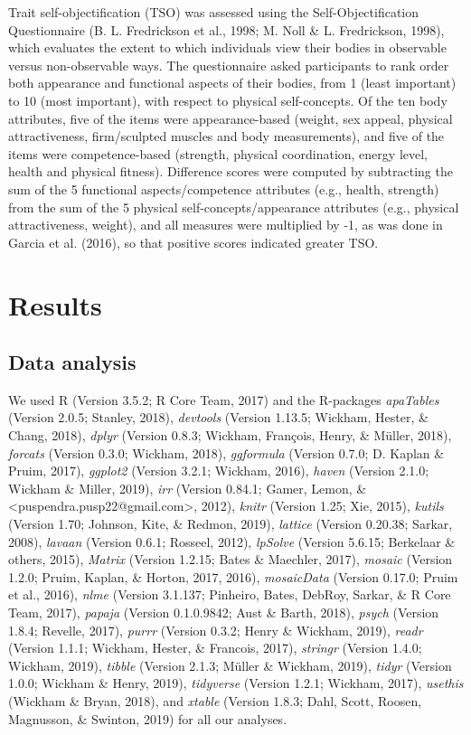 \documentclass[man]{apa6}
\begin{document}
Trait self-objectification (TSO) was assessed using the
Self-Objectification Questionnaire (B. L. Fredrickson et al., 1998; M.
Noll \& L. Fredrickson, 1998), which evaluates the extent to which
individuals view their bodies in observable versus non-observable ways.
The questionnaire asked participants to rank order both appearance and
functional aspects of their bodies, from 1 (least important) to 10 (most
important), with respect to physical self-concepts. Of the ten body
attributes, five of the items were appearance-based (weight, sex appeal,
physical attractiveness, firm/sculpted muscles and body measurements),
and five of the items were competence-based (strength, physical
coordination, energy level, health and physical fitness). Difference
scores were computed by subtracting the sum of the 5 functional
aspects/competence attributes (e.g., health, strength) from the sum of
the 5 physical self-concepts/appearance attributes (e.g., physical
attractiveness, weight), and all measures were multiplied by -1, as was
done in Garcia et al. (2016), so that positive scores indicated greater
TSO.

\section{Results}\label{results}

\subsection{Data analysis}\label{data-analysis}

We used R (Version 3.5.2; R Core Team, 2017) and the R-packages
\emph{apaTables} (Version 2.0.5; Stanley, 2018), \emph{devtools}
(Version 1.13.5; Wickham, Hester, \& Chang, 2018), \emph{dplyr} (Version
0.8.3; Wickham, François, Henry, \& Müller, 2018), \emph{forcats}
(Version 0.3.0; Wickham, 2018), \emph{ggformula} (Version 0.7.0; D.
Kaplan \& Pruim, 2017), \emph{ggplot2} (Version 3.2.1; Wickham, 2016),
\emph{haven} (Version 2.1.0; Wickham \& Miller, 2019), \emph{irr}
(Version 0.84.1; Gamer, Lemon, \&
\textless{}puspendra.pusp22@gmail.com\textgreater{}, 2012), \emph{knitr}
(Version 1.25; Xie, 2015), \emph{kutils} (Version 1.70; Johnson, Kite,
\& Redmon, 2019), \emph{lattice} (Version 0.20.38; Sarkar, 2008),
\emph{lavaan} (Version 0.6.1; Rosseel, 2012), \emph{lpSolve} (Version
5.6.15; Berkelaar \& others, 2015), \emph{Matrix} (Version 1.2.15; Bates
\& Maechler, 2017), \emph{mosaic} (Version 1.2.0; Pruim, Kaplan, \&
Horton, 2017, 2016), \emph{mosaicData} (Version 0.17.0; Pruim et al.,
2016), \emph{nlme} (Version 3.1.137; Pinheiro, Bates, DebRoy, Sarkar, \&
R Core Team, 2017), \emph{papaja} (Version 0.1.0.9842; Aust \& Barth,
2018), \emph{psych} (Version 1.8.4; Revelle, 2017), \emph{purrr}
(Version 0.3.2; Henry \& Wickham, 2019), \emph{readr} (Version 1.1.1;
Wickham, Hester, \& Francois, 2017), \emph{stringr} (Version 1.4.0;
Wickham, 2019), \emph{tibble} (Version 2.1.3; Müller \& Wickham, 2019),
\emph{tidyr} (Version 1.0.0; Wickham \& Henry, 2019), \emph{tidyverse}
(Version 1.2.1; Wickham, 2017), \emph{usethis} (Wickham \& Bryan, 2018),
and \emph{xtable} (Version 1.8.3; Dahl, Scott, Roosen, Magnusson, \&
Swinton, 2019) for all our analyses.
\end{document}
